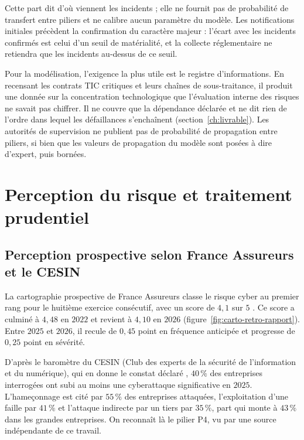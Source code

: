 Cette part dit d'où viennent les incidents ; elle ne fournit pas de probabilité de transfert entre piliers et ne calibre aucun paramètre du modèle. Les notifications initiales précèdent la confirmation du caractère majeur : l'écart avec les
incidents confirmés est celui d'un seuil de matérialité, et la collecte réglementaire ne retiendra que
les incidents au-dessus de ce seuil.

Pour la modélisation, l'exigence la plus utile est le registre d'informations. En recensant les
contrats TIC critiques et leurs chaînes de sous-traitance, il produit une donnée sur la concentration
technologique que l'évaluation interne des risques ne savait pas chiffrer. Il ne couvre que
la dépendance déclarée et ne dit rien de l'ordre dans lequel les défaillances s'enchaînent
(section~\ref{ch:livrable}). Les autorités de supervision ne publient pas de probabilité de
propagation entre piliers, si bien que les valeurs de propagation du modèle sont posées
à dire d'expert, puis bornées.

\section{Perception du risque et traitement prudentiel}
\label{sec:enjeu-prudentiel}

\subsection{Perception prospective selon France Assureurs et le CESIN}
\label{subsec:france-assureurs-cesin}

La cartographie prospective de France Assureurs classe le risque cyber au premier rang pour le
huitième exercice consécutif, avec un score de $4{,}1$ sur $5$ \citep{franceassureurs2026}. Ce score
a culminé à $4{,}48$ en $2022$ et revient à $4{,}10$ en $2026$ (figure~\ref{fig:carto-retro-rapport}).
Entre $2025$ et $2026$, il recule de $0{,}45$ point en fréquence anticipée et progresse de
$0{,}25$ point en sévérité.

D'après le baromètre du CESIN (Club des experts de la sécurité de l'information et du numérique), qui en donne le constat déclaré \citep{cesin2026}, $40\,\%$ des
entreprises interrogées ont subi au moins une cyberattaque significative en $2025$. L'hameçonnage
est cité par $55\,\%$ des entreprises attaquées, l'exploitation d'une faille par $41\,\%$ et l'attaque
indirecte par un tiers par $35\,\%$, part qui monte à $43\,\%$ dans les grandes entreprises. On
reconnaît là le pilier P4, vu par une source indépendante de ce travail.

